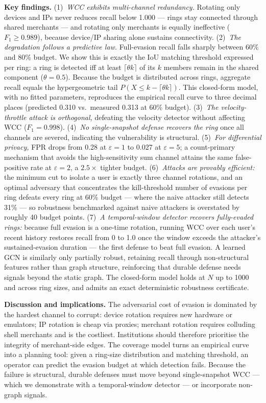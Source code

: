 \documentclass[12pt,a4paper]{article}
\begin{document}
\textbf{Key findings.} (1)~\textit{WCC exhibits multi-channel redundancy.}
Rotating only devices and IPs never reduces recall below 1.000 --- rings stay
connected through shared merchants --- and rotating only merchants is equally
ineffective ($F_1 \geq 0.989$), because device/IP sharing alone sustains
connectivity. (2)~\textit{The degradation follows a predictive law.}
Full-evasion recall falls sharply between 60\% and 80\% budget. We show this is
exactly the IoU matching threshold expressed per ring: a ring is detected iff at
least $\lceil \theta k \rceil$ of its $k$ members remain in the shared component
($\theta = 0.5$). Because the budget is distributed across rings, aggregate
recall equals the hypergeometric tail $P(X \leq k - \lceil \theta k \rceil)$.
This closed-form model, with no fitted parameters, reproduces the empirical
recall curve to three decimal places (predicted 0.310 vs.\ measured 0.313 at
60\% budget). (3)~\textit{The velocity-throttle attack is orthogonal,} defeating
the velocity detector without affecting WCC ($F_1 = 0.998$). (4)~\textit{No
single-snapshot defense recovers the ring} once all channels are severed,
indicating the vulnerability is structural. (5)~\textit{For differential
privacy,} FPR drops from 0.28 at $\varepsilon=1$ to 0.027 at $\varepsilon=5$; a
count-primary mechanism that avoids the high-sensitivity sum channel attains the
same false-positive rate at $\varepsilon=2$, a $2.5\times$ tighter budget.
(6)~\textit{Attacks are provably efficient:} the minimum cut to isolate a user
is exactly three channel rotations, and an optimal adversary that concentrates
the kill-threshold number of evasions per ring defeats every ring at 60\%
budget --- where the naive attacker still detects 31\% --- so robustness
benchmarked against naive attackers is overstated by roughly 40 budget points.
(7)~\textit{A temporal-window detector recovers fully-evaded rings:} because
full evasion is a one-time rotation, running WCC over each user's recent history
restores recall from 0 to 1.0 once the window exceeds the attacker's
sustained-evasion duration --- the first defense to beat full evasion. A learned
GCN is similarly only partially robust, retaining recall through non-structural
features rather than graph structure, reinforcing that durable defense needs
signals beyond the static graph. The closed-form model holds at $N$ up to 1000
and across ring sizes, and admits an exact deterministic robustness certificate.

\textbf{Discussion and implications.} The adversarial cost of evasion is
dominated by the hardest channel to corrupt: device rotation requires new
hardware or emulators; IP rotation is cheap via proxies; merchant rotation
requires colluding shell merchants and is the costliest. Institutions should
therefore prioritise the integrity of merchant-side edges. The coverage model
turns an empirical curve into a planning tool: given a ring-size distribution
and matching threshold, an operator can predict the evasion budget at which
detection fails. Because the failure is structural, durable defenses must move
beyond single-snapshot WCC --- which we demonstrate with a temporal-window
detector --- or incorporate non-graph signals.
\end{document}
